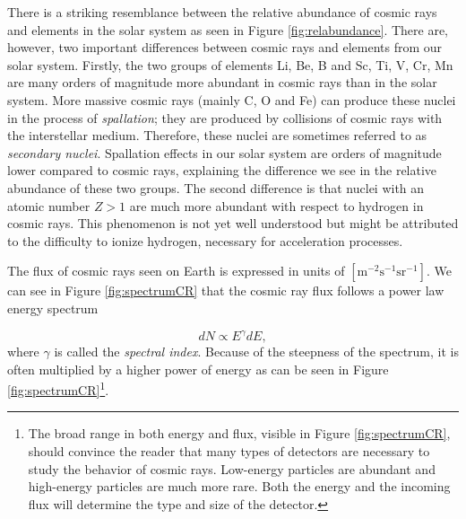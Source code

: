 There is a striking resemblance between the relative abundance of cosmic rays and elements in the solar system as seen in Figure \ref{fig:relabundance}. There are, however, two important differences between cosmic rays and elements from our solar system. Firstly, the two groups of elements Li, Be, B and Sc, Ti, V, Cr, Mn are many orders of magnitude more abundant in cosmic rays than in the solar system. More massive cosmic rays (mainly C, O and Fe) can produce these nuclei in the process of \textit{spallation}; they are produced by collisions of cosmic rays with the interstellar medium. Therefore, these nuclei are sometimes referred to as \textit{secondary nuclei}. Spallation effects in our solar system are orders of magnitude lower compared to cosmic rays, explaining the difference we see in the relative abundance of these two groups.
The second difference is that nuclei with an atomic number $Z>1$ are much more abundant with respect to hydrogen in cosmic rays. This phenomenon is not yet well understood but might be attributed to the difficulty to ionize hydrogen, necessary for acceleration processes.

The flux of cosmic rays seen on Earth is expressed in units of $\left[\textrm{m}^{-2} \textrm{s}^{-1} \textrm{sr}^{-1}\right]$. We can see in Figure \ref{fig:spectrumCR} that the cosmic ray flux follows a power law energy spectrum

\begin{equation}
\label{eq:spectrum}
dN \varpropto E^{\gamma} dE,
\end{equation} 
where $\gamma$ is called the \textit{spectral index}. Because of the steepness of the spectrum, it is often multiplied by a higher power of energy as can be seen in Figure \ref{fig:spectrumCR}\footnote{The broad range in both energy and flux, visible in Figure \ref{fig:spectrumCR}, should convince the reader that many types of detectors are necessary to study the behavior of cosmic rays. Low-energy particles are abundant and high-energy particles are much more rare. Both the energy and the incoming flux will determine the type and size of the detector.}.

